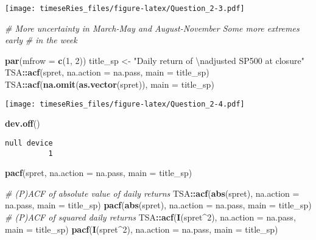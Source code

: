 \documentclass[]{book}
\newenvironment{Shaded}{\begin{snugshade}}{\end{snugshade}}
\newcommand{\CharTok}[1]{\textcolor[rgb]{0.31,0.60,0.02}{#1}}
\newcommand{\CommentTok}[1]{\textcolor[rgb]{0.56,0.35,0.01}{\textit{#1}}}
\newcommand{\DataTypeTok}[1]{\textcolor[rgb]{0.13,0.29,0.53}{#1}}
\newcommand{\DecValTok}[1]{\textcolor[rgb]{0.00,0.00,0.81}{#1}}
\newcommand{\KeywordTok}[1]{\textcolor[rgb]{0.13,0.29,0.53}{\textbf{#1}}}
\newcommand{\NormalTok}[1]{#1}
\newcommand{\OperatorTok}[1]{\textcolor[rgb]{0.81,0.36,0.00}{\textbf{#1}}}
\newcommand{\StringTok}[1]{\textcolor[rgb]{0.31,0.60,0.02}{#1}}
\begin{document}
\texttt{[image: timeseRies\_files/figure-latex/Question\_2-3.pdf]}

\begin{Shaded}
\begin{Highlighting}[]
\CommentTok{# More uncertainty in March-May and August-November Some more extremes early}
\CommentTok{# in the week}

\KeywordTok{par}\NormalTok{(}\DataTypeTok{mfrow =} \KeywordTok{c}\NormalTok{(}\DecValTok{1}\NormalTok{, }\DecValTok{2}\NormalTok{))}
\NormalTok{title_sp <-}\StringTok{ "Daily return of }\CharTok{\textbackslash{}n}\StringTok{adjusted SP500 at closure"}
\NormalTok{TSA}\OperatorTok{::}\KeywordTok{acf}\NormalTok{(spret, }\DataTypeTok{na.action =}\NormalTok{ na.pass, }\DataTypeTok{main =}\NormalTok{ title_sp)}
\NormalTok{TSA}\OperatorTok{::}\KeywordTok{acf}\NormalTok{(}\KeywordTok{na.omit}\NormalTok{(}\KeywordTok{as.vector}\NormalTok{(spret)), }\DataTypeTok{main =}\NormalTok{ title_sp)}
\end{Highlighting}
\end{Shaded}

\texttt{[image: timeseRies\_files/figure-latex/Question\_2-4.pdf]}

\begin{Shaded}
\begin{Highlighting}[]
\KeywordTok{dev.off}\NormalTok{()}
\end{Highlighting}
\end{Shaded}

\begin{verbatim}
null device 
          1 
\end{verbatim}

\begin{Shaded}
\begin{Highlighting}[]
\KeywordTok{pacf}\NormalTok{(spret, }\DataTypeTok{na.action =}\NormalTok{ na.pass, }\DataTypeTok{main =}\NormalTok{ title_sp)}

\CommentTok{# (P)ACF of absolute value of daily returns}
\NormalTok{TSA}\OperatorTok{::}\KeywordTok{acf}\NormalTok{(}\KeywordTok{abs}\NormalTok{(spret), }\DataTypeTok{na.action =}\NormalTok{ na.pass, }\DataTypeTok{main =}\NormalTok{ title_sp)}
\KeywordTok{pacf}\NormalTok{(}\KeywordTok{abs}\NormalTok{(spret), }\DataTypeTok{na.action =}\NormalTok{ na.pass, }\DataTypeTok{main =}\NormalTok{ title_sp)}
\CommentTok{# (P)ACF of squared daily returns}
\NormalTok{TSA}\OperatorTok{::}\KeywordTok{acf}\NormalTok{(}\KeywordTok{I}\NormalTok{(spret}\OperatorTok{^}\DecValTok{2}\NormalTok{), }\DataTypeTok{na.action =}\NormalTok{ na.pass, }\DataTypeTok{main =}\NormalTok{ title_sp)}
\KeywordTok{pacf}\NormalTok{(}\KeywordTok{I}\NormalTok{(spret}\OperatorTok{^}\DecValTok{2}\NormalTok{), }\DataTypeTok{na.action =}\NormalTok{ na.pass, }\DataTypeTok{main =}\NormalTok{ title_sp)}
\end{Highlighting}
\end{Shaded}
\end{document}
